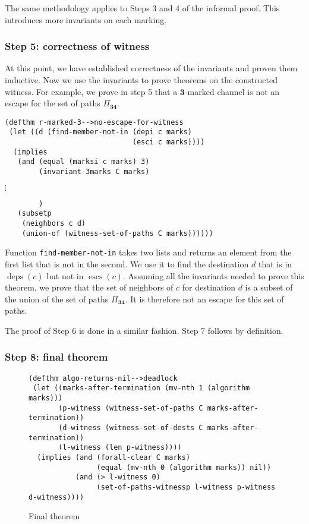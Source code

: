 \documentclass[submission,copyright]{eptcs}
\DeclareMathOperator{\escs}{escs}
\DeclareMathOperator{\deps}{deps}
\begin{document}
The same methodology applies to Steps 3 and 4 of the informal proof. This introduces more invariants on each marking.

\subsubsection{Step 5: correctness of witness}
At this point, we have established correctness of the invariants and proven them inductive. Now we use the invariants to prove theorems on the constructed witness. For example, we prove in step 5 that a $\mathbf{3}$-marked channel is not an escape for the set of paths $\Pi_\mathbf{34}$.
\begin{verbatim}
(defthm r-marked-3-->no-escape-for-witness
 (let ((d (find-member-not-in (depi c marks)
                              (esci c marks))))
  (implies
   (and (equal (marksi c marks) 3)
        (invariant-3marks C marks)
\end{verbatim}
\vspace{-1em}\hspace{10ex}$\vdots$\hspace{2ex}{\tt invariants}
\vspace{-1em}
\begin{verbatim}
        )
   (subsetp
    (neighbors c d)  
    (union-of (witness-set-of-paths C marks))))))
\end{verbatim}
Function {\tt find-member-not-in} takes two lists and returns an element from the first list that is not in the second. We use it to find the destination $d$ that is in $\deps(c)$ but not in $\escs(c)$. Assuming all the invariants needed to prove this theorem, we prove that the set of neighbors of $c$ for destination $d$ is a subset of the union of the set of paths $\Pi_\mathbf{34}$.
It is therefore not an escape for this set of paths.

The proof of Step 6 is done in a similar fashion. Step 7 follows by definition.

\subsubsection{Step 8: final theorem}
\begin{figure*}[ht]
\centering
\begin{minipage}{0.75\textwidth}
\begin{verbatim}
(defthm algo-returns-nil-->deadlock
 (let ((marks-after-termination (mv-nth 1 (algorithm marks)))
       (p-witness (witness-set-of-paths C marks-after-termination))
       (d-witness (witness-set-of-dests C marks-after-termination))
       (l-witness (len p-witness))))
  (implies (and (forall-clear C marks)
                (equal (mv-nth 0 (algorithm marks)) nil))
           (and (> l-witness 0)
                (set-of-paths-witnessp l-witness p-witness d-witness))))
\end{verbatim}
\end{minipage}
\caption{Final theorem}
\label{fig:finaltheorem}
\end{figure*}
\end{document}
